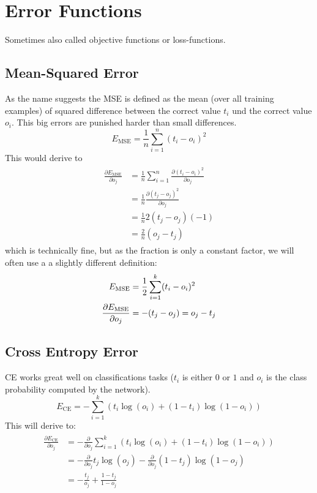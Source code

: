 \section{Error Functions}
Sometimes also called objective functions or loss-functions.

\subsection{Mean-Squared Error}\label{sec:mse}
As the name suggests the \gls{MSE} is defined as the mean (over all training examples) of squared difference between the correct value $t_i$ und the correct value $o_i$. This big errors are punished harder than small differences.
\begin{equation}\label{eq:mse}
E_{\text{MSE}} = \frac{1}{n} \sum_{i=1}^n (t_i - o_i)^2
\end{equation}
This would derive to
\begin{align}
\begin{split}
\frac{\partial E_{\text{MSE}}}{\partial o_j}
&= \frac{1}{n} \sum_{i=1}^n \frac{\partial (t_i - o_i)^2}{\partial o_j}\\
&= \frac{1}{n} \frac{\partial (t_j - o_j)^2}{\partial o_j}\\
&= \frac{1}{n} 2 (t_j - o_j) (-1)\\
&= \frac{2}{n} (o_j - t_j)
\end{split}
\end{align}
which is technically fine, but as the fraction is only a constant factor, we will often use a a slightly different definition:
\begin{align}\label{ed:mse2}
E_{\text{MSE}} &= \frac{1}{2} \sum_{i=1}^k (t_i - o_i)^2\\
\frac{\partial E_{\text{MSE}}}{\partial o_j}
&= - (t_j - o_j) = o_j - t_j
\end{align}

\subsection{Cross Entropy Error}\label{sec:ce}
\Gls{CE} works great well on classifications tasks ($t_i$ is either $0$ or $1$ and $o_i$ is the class probability computed by the network).
\begin{equation}\label{eq:ce}
E_{\text{CE}} = - \sum_{i=1}^k \left( t_i \log(o_i) + (1 - t_i) \log(1 - o_i) \right)
\end{equation}
This will derive to:
\begin{align}
\begin{split}
\frac{\partial E_{\text{CE}}}{\partial o_j} &= - \frac{\partial}{\partial o_j} \sum_{i=1}^k \left( t_i \log(o_i) + (1 - t_i) \log(1 - o_i) \right)\\
&= - \frac{\partial}{\partial o_j} t_j \log(o_j) - \frac{\partial}{\partial o_j} (1 - t_j) \log(1 - o_j)\\
&= - \frac{t_j}{o_j} + \frac{1 - t_j}{1 - o_j}
\end{split}
\end{align}